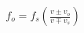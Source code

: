 \documentclass[preview]{standalone}
\begin{document}
\begin{align*}
f_{o}=f_{s}\left(\frac{v\pm v_{o}}{v\mp v_{s}}\right)
\end{align*}
\end{document}
